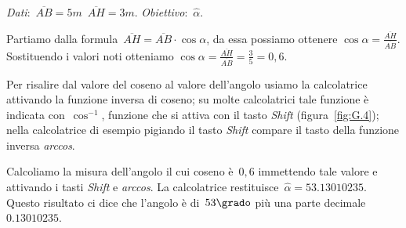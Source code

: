 \emph{Dati}:~\(\overline{AB}=5\unit{m}\)\quad~\(\overline{AH}=3\unit{m}\). 
\qquad\emph{Obiettivo}:~\(\hat{\alpha}\).

\begin{soluzione}
 Partiamo dalla formula~\(\overline{AH}=\overline{AB}\cdot \cos \alpha\), da 
essa 
possiamo ottenere
\(\cos \alpha=\frac{\overline{AH}}{\overline{AB}}\). Sostituendo i valori noti 
otteniamo
\(\cos \alpha=\frac{\overline{AH}}{\overline{AB}}=\frac{3}{5}=0,6\).

Per risalire dal valore del coseno al valore dell'angolo usiamo la 
calcolatrice 
attivando la funzione inversa di coseno; su molte calcolatrici
tale funzione è indicata con~\(\cos^{-1}\), funzione che si attiva con il tasto 
\emph{Shift} (figura~\ref{fig:G.4}); nella calcolatrice
di esempio pigiando il tasto \emph{Shift} compare il tasto della funzione 
inversa \emph{arccos}.

Calcoliamo la misura dell'angolo il cui coseno è~\(0,6\) immettendo tale valore 
e 
attivando i tasti \emph{Shift} e \emph{arccos}.
La calcolatrice restituisce~\({\hat{\alpha}}= 53.13010235\).
Questo risultato ci dice che l'angolo è di~\(53\grado\) più una parte 
decimale~\(0.13010235\).
% 
\end{soluzione}

